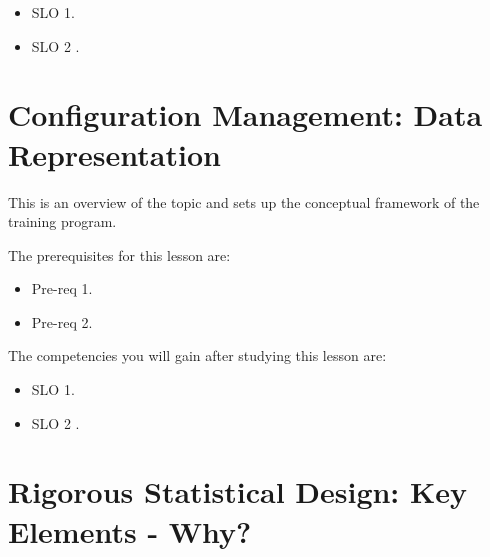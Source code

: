 \begin{itemize}
    \item SLO 1.
\end{itemize}

\begin{itemize}
    \item SLO 2 .
\end{itemize}

\section{Configuration Management: Data Representation}
\label{sec:configuration-management-data-representation}

This is an overview of the topic and sets up the conceptual framework of the training program.




The prerequisites for this lesson are: 




\begin{itemize}
    \item Pre-req 1.
\end{itemize}

\begin{itemize}
    \item Pre-req 2.
\end{itemize}




The competencies you will gain after studying this lesson are: 




\begin{itemize}
    \item SLO 1.
\end{itemize}

\begin{itemize}
    \item SLO 2 .
\end{itemize}

\section{Rigorous Statistical Design: Key Elements - Why?}
\label{sec:rigorous-statistical-design-key-elements-why}

